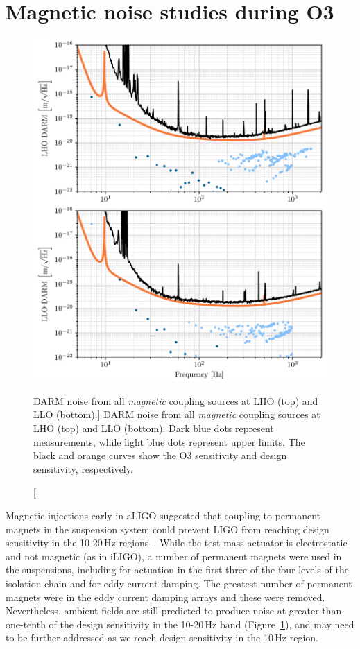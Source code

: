 \section{Magnetic noise studies during O3}\label{sec:mag}

\begin{figure}
	\centering
	\includegraphics{figures/noise-studies/mag-ambient.pdf}
	\caption
	[DARM noise from all \textit{magnetic} coupling sources at LHO (top) and LLO (bottom).]
	{DARM noise from all \textit{magnetic} coupling sources at LHO (top) and LLO (bottom).
	 Dark blue dots represent measurements, while light blue dots represent upper limits.
	 The black and orange curves show the O3 sensitivity and design sensitivity, respectively.
	 }
	\label{fig:mag-ambient}
\end{figure}

Magnetic injections early in \ac{aLIGO} suggested that coupling to permanent magnets in the suspension system  could prevent \ac{LIGO} from reaching design sensitivity in the 10-20\,Hz regions~\citep{Schofield_2013}.
While the test mass actuator is electrostatic and not magnetic (as in \ac{iLIGO}), a number of permanent magnets were used in the suspensions, including for actuation in the first three of the four levels of the isolation chain and for eddy current damping.
The greatest number of permanent magnets were in the eddy current damping arrays and these were removed.
Nevertheless, ambient fields are still predicted to produce noise at greater than one-tenth of the design sensitivity in the 10-20\,Hz band (Figure~\ref{fig:mag-ambient}), and may need to be further addressed as we reach design sensitivity in the 10\,Hz region.

